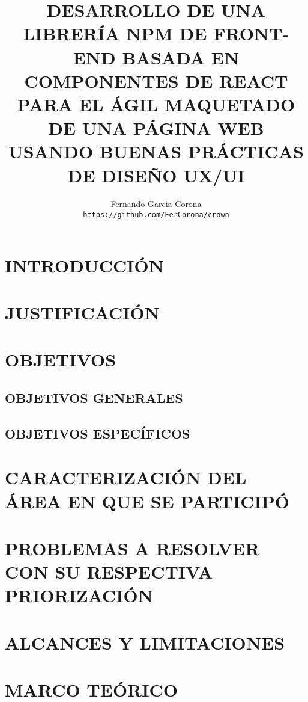 \documentclass[a4paper,12pt]{report}
\author{
  Fernando Garcia Corona\\
  \texttt{https://github.com/FerCorona/crown}
}
\title{DESARROLLO DE UNA LIBRERÍA NPM DE FRONT-END BASADA EN COMPONENTES DE REACT PARA EL ÁGIL MAQUETADO DE UNA PÁGINA WEB USANDO BUENAS PRÁCTICAS DE DISEÑO UX/UI}
\begin{document}
	\maketitle
	
	\tableofcontents
	
		\chapter {INTRODUCCIÓN}
			
		\chapter {JUSTIFICACIÓN }
			
		
		\chapter {OBJETIVOS }
			\section {OBJETIVOS GENERALES}
				
			
			\section {OBJETIVOS ESPECÍFICOS} 
				
		
		\chapter {CARACTERIZACIÓN DEL ÁREA EN QUE SE PARTICIPÓ }
			
		
		\chapter {PROBLEMAS A RESOLVER CON SU RESPECTIVA PRIORIZACIÓN }
			
			
		\chapter {ALCANCES Y LIMITACIONES }
				
		
		\chapter {MARCO TEÓRICO  }
			
		
\end{document}
